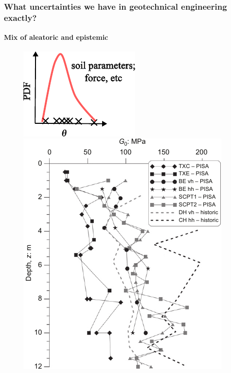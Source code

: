 \begin{frame}
\frametitle{What uncertainties we have in geotechnical engineering exactly?}
\framesubtitle{Mix of aleatoric and epistemic}
    \begin{figure}
    \includegraphics[scale=1]{figures/figure-UQtype1.pdf}    
    \hfill
    \includegraphics[scale=0.4]{figures/figure-UQtype2.pdf}
    \hfill

\end{figure}
\end{frame}
